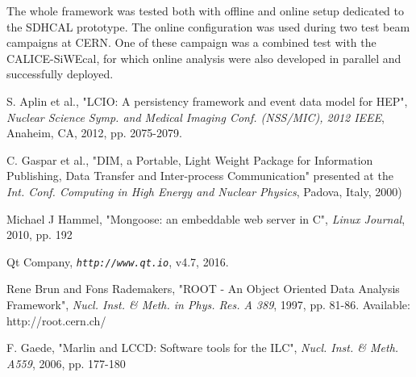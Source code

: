 \documentclass[journal]{IEEEtran}
\begin{document}
The whole framework was tested both with offline and online setup dedicated to the SDHCAL prototype. The online configuration was used during two test beam campaigns at CERN. One of these campaign was a combined test with the CALICE-SiWEcal, for which online analysis were also developed in parallel and successfully deployed.







%
%
%

\begin{thebibliography}{6}

S. Aplin et al., "LCIO: A persistency framework and event data model for HEP", \emph{Nuclear Science Symp. and Medical Imaging Conf. (NSS/MIC), 2012 IEEE}, Anaheim, CA, 2012, pp. 2075-2079.

C. Gaspar et al., "DIM, a Portable, Light Weight Package for Information Publishing, Data Transfer and Inter-process Communication" presented at the \emph{Int. Conf. Computing in High Energy and Nuclear Physics}, Padova, Italy, 2000)

Michael J Hammel, "Mongoose: an embeddable web server in C", \emph{Linux Journal}, 2010, pp. 192

Qt Company, \emph{\tt http://www.qt.io}, v4.7, 2016.

Rene Brun and Fons Rademakers, "ROOT - An Object Oriented Data Analysis Framework", \emph{Nucl. Inst. \& Meth. in Phys. Res. A 389}, 1997, pp. 81-86. Available: http://root.cern.ch/

F. Gaede,  "Marlin and LCCD: Software tools for the ILC", \emph{Nucl. Inst. \& Meth. A559}, 2006, pp. 177-180

\end{thebibliography}






\end{document}
